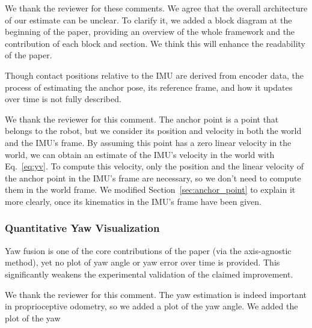 We thank the reviewer for these comments. We agree that the overall architecture of our estimate can be unclear. To clarify it, we added a block diagram \io at the beginning of the paper, providing an overview of the whole framework and the contribution of each block and section. We think this will enhance the readability of the paper.

\begin{revquote}
Though contact positions relative to the IMU are derived from encoder data, the process of estimating the anchor pose, its reference frame, and how it updates over time is not fully described.
\end{revquote}

We thank the reviewer for this comment. The anchor point is a point that belongs to the robot, but we consider its position and velocity in both the world and the IMU's frame. By assuming this point has a zero linear velocity in the world, we can obtain an estimate of the IMU's velocity in the world with Eq.~\eqref{eq:yv}. To compute this velocity, only the position and the linear velocity of the anchor point in the IMU's frame are necessary, so we don't need to compute them in the world frame. We modified Section~\ref{sec:anchor_point} to explain it more clearly, once its kinematics in the IMU's frame have been given.

\subsubsection{Quantitative Yaw Visualization}

\begin{revquote}
Yaw fusion is one of the core contributions of the paper (via the axis-agnostic method), yet no plot of yaw angle or yaw error over time is provided. This significantly weakens the experimental validation of the claimed improvement.
\end{revquote}

We thank the reviewer for this comment. The yaw estimation is indeed important in proprioceptive odometry, so we added a plot of the yaw angle. \alert{We added the plot of the yaw}

